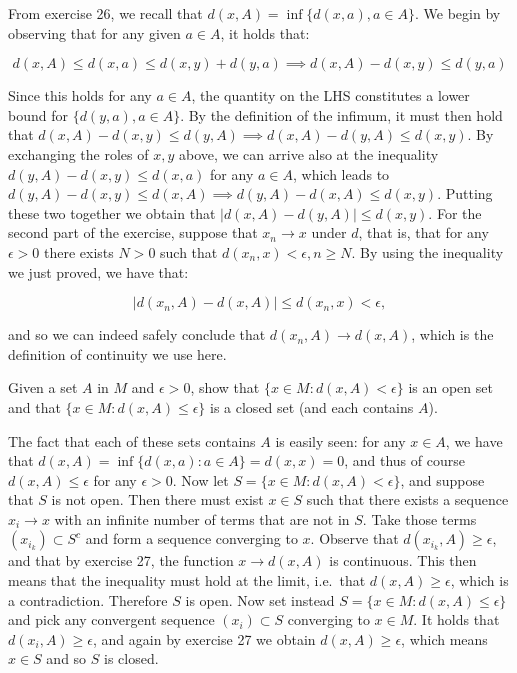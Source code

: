 \begin{solution}
    
    From exercise 26, we recall that $d(x, A) = \inf \{d(x, a), a \in A \}$.
    We begin by observing that for any given $a \in A$, it holds that:

    $$d(x, A) \leq d(x, a) \leq d(x, y) + d(y, a) \implies d(x, A) - d(x, y) \leq d(y, a)$$

    Since this holds for any $a \in A$, the quantity on the LHS constitutes a lower bound for $\{d(y, a), a \in A\}$.
    By the definition of the infimum, it must then hold that $d(x, A) - d(x, y) \leq d(y, A) \implies d(x, A) - d(y, A) \leq d(x, y)$.
    By exchanging the roles of $x, y$ above, we can arrive also at the inequality $d(y, A) - d(x, y) \leq d(x, a)$ for any $a \in A$, which leads to $d(y, A) - d(x, y) \leq d(x, A) \implies d(y, A) - d(x, A) \leq d(x, y)$.
    Putting these two together we obtain that $\lvert d(x, A) - d(y, A) \rvert \leq d(x, y)$.
    For the second part of the exercise, suppose that $x_n \rightarrow x$ under $d$, that is, that for any $\epsilon > 0$ there exists $N > 0$ such that $d(x_n, x) < \epsilon, n \geq N$.
    By using the inequality we just proved, we have that:

    $$\lvert d(x_n, A) - d(x, A) \rvert \leq d(x_n, x) < \epsilon,$$

    and so we can indeed safely conclude that $d(x_n, A) \rightarrow d(x, A)$, which is the definition of continuity we use here.
\end{solution}


\begin{exercise}{28}
    Given a set $A$ in $M$ and $\epsilon > 0$, show that $\{x \in M: d(x, A) < \epsilon\}$ is an open set and that $\{x \in M: d(x, A) \leq \epsilon\}$ is a closed set (and each contains $A$).
\end{exercise}

\begin{solution}
    
    The fact that each of these sets contains $A$ is easily seen: for any $x \in A$, we have that $d(x, A) = \inf\{d(x, a): a \in A\} = d(x, x) = 0$, and thus of course $d(x, A) \leq \epsilon$ for any $\epsilon > 0$.
    Now let $S = \{x \in M: d(x, A) < \epsilon\}$, and suppose that $S$ is not open.
    Then there must exist $x \in S$ such that there exists a sequence $x_i \rightarrow x$ with an infinite number of terms that are not in $S$.
    Take those terms $(x_{i_k}) \subset S^c$ and form a sequence converging to $x$.
    Observe that $d(x_{i_k}, A) \geq \epsilon$, and that by exercise 27, the function $x \rightarrow d(x, A)$ is continuous.
    This then means that the inequality must hold at the limit, i.e.\ that $d(x, A) \geq \epsilon$, which is a contradiction.
    Therefore $S$ is open.
    Now set instead $S = \{x \in M: d(x, A) \leq \epsilon \}$ and pick any convergent sequence $(x_i) \subset S$  converging to $x \in M$.
    It holds that $d(x_i, A) \geq \epsilon$, and again by exercise 27 we obtain $d(x, A) \geq \epsilon$, which means $x \in S$ and so $S$ is closed.
\end{solution}

